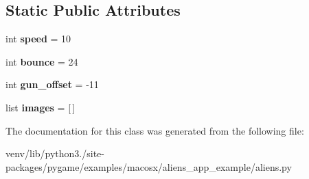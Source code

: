 \subsection*{Static Public Attributes}
\begin{DoxyCompactItemize}
\item 
\mbox{\label{classaliens_1_1_player_a361d1a0c543dc088706d2f22d72cdd79}} 
int {\bfseries speed} = 10
\item 
\mbox{\label{classaliens_1_1_player_ae7742171044b484ac15d0404eb85ba77}} 
int {\bfseries bounce} = 24
\item 
\mbox{\label{classaliens_1_1_player_abf1cfd484bf8983ccd137c6e3fc85846}} 
int {\bfseries gun\+\_\+offset} = -\/11
\item 
\mbox{\label{classaliens_1_1_player_a766f241da334ba948b48e32720ba0337}} 
list {\bfseries images} = \mbox{[}$\,$\mbox{]}
\end{DoxyCompactItemize}


The documentation for this class was generated from the following file\+:\begin{DoxyCompactItemize}
\item 
venv/lib/python3./site-\/packages/pygame/examples/macosx/aliens\+\_\+app\+\_\+example/aliens.\+py\end{DoxyCompactItemize}
